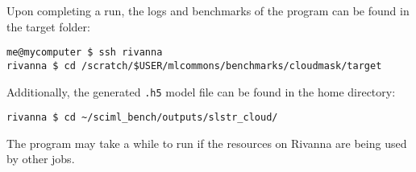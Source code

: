 Upon completing a run, the logs and benchmarks of the program can be
found in the target folder:

\bigbreak
\begin{verbatim}
me@mycomputer $ ssh rivanna
rivanna $ cd /scratch/$USER/mlcommons/benchmarks/cloudmask/target
\end{verbatim}
\bigbreak

Additionally, the generated \texttt{.h5} model file can be found in the
home directory:

\bigbreak
\begin{verbatim}
rivanna $ cd ~/sciml_bench/outputs/slstr_cloud/
\end{verbatim}
\bigbreak

The program may take a while to run if the resources on Rivanna are
being used by other jobs.
